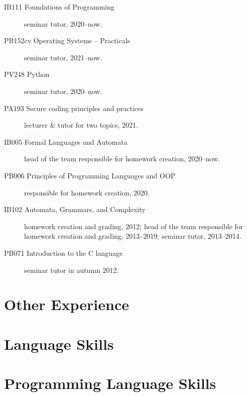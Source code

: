 \documentclass[11pt,a4paper,roman]{moderncv}        %
\begin{document}
\begin{description}
		\item[IB111 Foundations of Programming] seminar tutor, 2020--now.

		\item[PB152cv Operating Systems – Practicals] seminar tutor, 2021--now.

		\item[PV248 Python] seminar tutor, 2020--now.

		\item[PA193 Secure coding principles and practices] lecturer \& tutor for two topics, 2021.


        \item[IB005 Formal Languages and Automata] head of the team responsible for homework creation, 2020--now.

		\item[PB006 Principles of Programming Languages and OOP] responsible for homework creation, 2020.


        \item[IB102 Automata, Grammars, and Complexity] homework creation and grading, 2012; head of the team responsible for homework creation and grading, 2013--2019; seminar tutor, 2013--2014.

        \item[PB071 Introduction to the C language] seminar tutor in autumn 2012.
    \end{description}
    \endgroup

\section{Other Experience}


\section{Language Skills}


\section{Programming Language Skills}


\clearpage
\nocite{*}
\printbibliography[title={Publications}]
\end{document}
